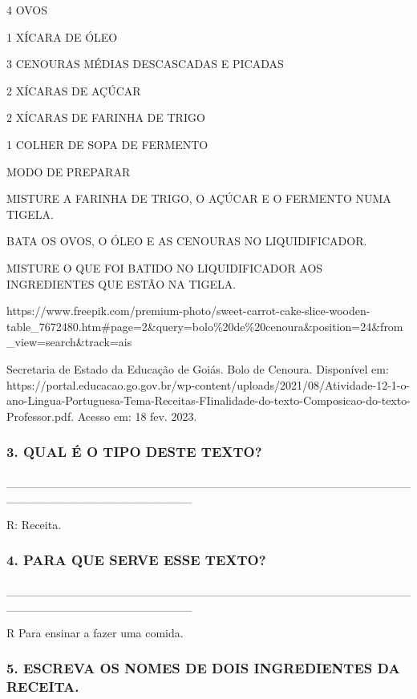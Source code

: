 4 OVOS

1 XÍCARA DE ÓLEO

3 CENOURAS MÉDIAS DESCASCADAS E PICADAS

2 XÍCARAS DE AÇÚCAR

2 XÍCARAS DE FARINHA DE TRIGO

1 COLHER DE SOPA DE FERMENTO

MODO DE PREPARAR


  MISTURE A FARINHA DE TRIGO, O AÇÚCAR E O FERMENTO NUMA TIGELA.

  BATA OS OVOS, O ÓLEO E AS CENOURAS NO LIQUIDIFICADOR.

  MISTURE O QUE FOI BATIDO NO LIQUIDIFICADOR AOS INGREDIENTES QUE ESTÃO
  NA TIGELA.


https://www.freepik.com/premium-photo/sweet-carrot-cake-slice-wooden-table\_7672480.htm\#page=2\&query=bolo\%20de\%20cenoura\&position=24\&from\_view=search\&track=ais

Secretaria de Estado da Educação de Goiás. Bolo de Cenoura. Disponível
em: https://portal.educacao.go.gov.br/wp-content/uploads/2021/08/Atividade-12-1-o-ano-Lingua-Portuguesa-Tema-Receitas-FIinalidade-do-texto-Composicao-do-texto-Professor.pdf. Acesso em: 18 fev. 2023.

\subsubsection{3. QUAL É O TIPO DESTE
TEXTO?}\label{qual-uxe9-o-nome-desse-texto}

\_\_\_\_\_\_\_\_\_\_\_\_\_\_\_\_\_\_\_\_\_\_\_\_\_\_\_\_\_\_\_\_\_\_\_\_\_\_\_\_\_\_\_\_\_\_\_\_\_\_\_\_\_\_\_\_\_\_\_\_\_\_\_\_\_\_\_\_\_\_

R: Receita.\protect\hypertarget{_heading=h.sb19dr2f5edy}{}{}

\subsubsection{4. PARA QUE SERVE ESSE
TEXTO?}\label{para-que-serve-esse-texto}

\_\_\_\_\_\_\_\_\_\_\_\_\_\_\_\_\_\_\_\_\_\_\_\_\_\_\_\_\_\_\_\_\_\_\_\_\_\_\_\_\_\_\_\_\_\_\_\_\_\_\_\_\_\_\_\_\_\_\_\_\_\_\_\_\_\_\_\_\_\_

R Para ensinar a fazer uma comida.

\subsubsection{5. ESCREVA OS NOMES DE DOIS INGREDIENTES DA
RECEITA.}\label{escreva-dois-nomes-dos-ingredientes-da-receita.}

